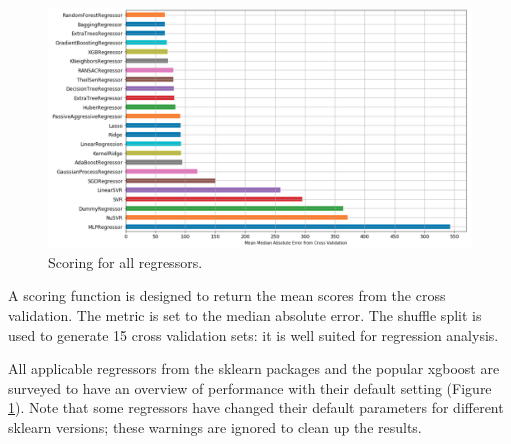 \documentclass[a4paper]{article}
\begin{document}
				\begin{figure}
					\centering
					\includegraphics[width=1\textwidth]{Regressors.png}
					\caption{\label{fig:regressors}Scoring for all regressors.}
				\end{figure}	
				
				A scoring function is designed to return the mean scores from the cross validation. The metric is set to the median absolute error. The shuffle split is used to generate 15 cross validation sets: it is well suited for regression analysis.
				
				All applicable regressors from the sklearn packages and the popular xgboost are surveyed to have an overview of performance with their default setting (Figure \ref{fig:regressors}). Note that some regressors have changed their default parameters for different sklearn versions; these warnings are ignored to clean up the results.
				
\end{document}
